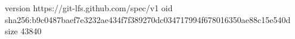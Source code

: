 version https://git-lfs.github.com/spec/v1
oid sha256:b9c0487baef7e3232ae434f7f389270dc034717994f678016350ae88c15e540d
size 43840
